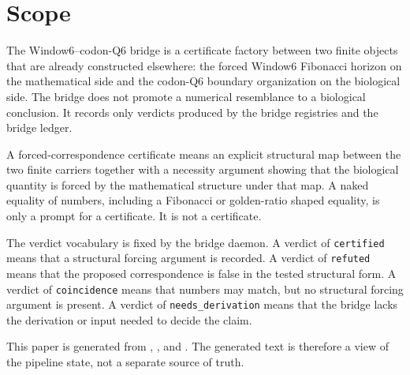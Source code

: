 \section{Scope}
The Window6--codon-Q6 bridge is a certificate factory between two finite objects that
are already constructed elsewhere: the forced Window6 Fibonacci horizon on the
mathematical side and the codon-Q6 boundary organization on the biological side.  The
bridge does not promote a numerical resemblance to a biological conclusion.  It records
only verdicts produced by the bridge registries and the bridge ledger.

A forced-correspondence certificate means an explicit structural map between the two
finite carriers together with a necessity argument showing that the biological quantity
is forced by the mathematical structure under that map.  A naked equality of numbers,
including a Fibonacci or golden-ratio shaped equality, is only a prompt for a certificate.
It is not a certificate.

The verdict vocabulary is fixed by the bridge daemon.  A verdict of \texttt{certified}
means that a structural forcing argument is recorded.  A verdict of \texttt{refuted}
means that the proposed correspondence is false in the tested structural form.  A
verdict of \texttt{coincidence} means that numbers may match, but no structural forcing
argument is present.  A verdict of \texttt{needs\_derivation} means that the bridge lacks
the derivation or input needed to decide the claim.

This paper is generated from ,
, and
.  The generated text is therefore
a view of the pipeline state, not a separate source of truth.

